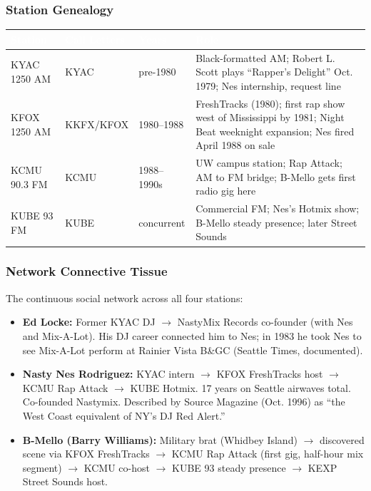 \documentclass[11pt,letterpaper]{article}
\newcommand{\tableheader}[1]{\textbf{\sffamily\textcolor{white}{#1}}}
\begin{document}
\subsubsection{Station Genealogy}

\begin{center}
\begin{tabularx}{\textwidth}{L{2.2cm}L{2.8cm}L{2.2cm}X}
\toprule
{}
\tableheader{Station} & \tableheader{Call Letters} & \tableheader{Years} & \tableheader{Role} \\
\midrule
KYAC 1250 AM & KYAC & pre-1980 & Black-formatted AM; Robert L. Scott plays ``Rapper's Delight'' Oct. 1979; Nes internship, request line \\
KFOX 1250 AM & KKFX/KFOX & 1980--1988 & FreshTracks (1980); first rap show west of Mississippi by 1981; Night Beat weeknight expansion; Nes fired April 1988 on sale \\
KCMU 90.3 FM & KCMU & 1988--1990s & UW campus station; Rap Attack; AM to FM bridge; B-Mello gets first radio gig here \\
KUBE 93 FM & KUBE & concurrent & Commercial FM; Nes's Hotmix show; B-Mello steady presence; later Street Sounds \\
\bottomrule
\end{tabularx}
\end{center}

\subsubsection{Network Connective Tissue}

The continuous social network across all four stations:
\begin{itemize}
  \item \textbf{Ed Locke:} Former KYAC DJ $\rightarrow$ NastyMix Records co-founder (with Nes and Mix-A-Lot). His DJ career connected him to Nes; in 1983 he took Nes to see Mix-A-Lot perform at Rainier Vista B\&GC (Seattle Times, documented).
  \item \textbf{Nasty Nes Rodriguez:} KYAC intern $\rightarrow$ KFOX FreshTracks host $\rightarrow$ KCMU Rap Attack $\rightarrow$ KUBE Hotmix. 17 years on Seattle airwaves total. Co-founded Nastymix. Described by Source Magazine (Oct. 1996) as ``the West Coast equivalent of NY's DJ Red Alert.''
  \item \textbf{B-Mello (Barry Williams):} Military brat (Whidbey Island) $\rightarrow$ discovered scene via KFOX FreshTracks $\rightarrow$ KCMU Rap Attack (first gig, half-hour mix segment) $\rightarrow$ KCMU co-host $\rightarrow$ KUBE 93 steady presence $\rightarrow$ KEXP Street Sounds host.
\end{itemize}
\end{document}
